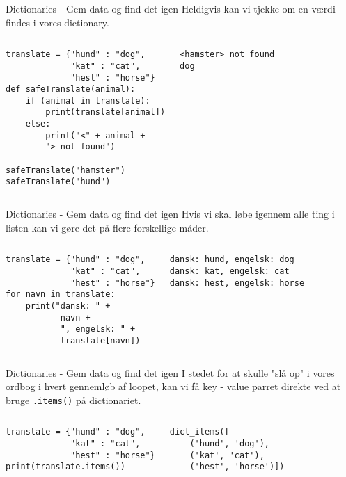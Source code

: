 \documentclass[main.tex]{subfiles}
\begin{document}
\begin{frame}[fragile]{Dictionaries - Gem data og find det igen}
	Heldigvis kan vi tjekke om en værdi findes i vores dictionary.
	\begin{columns}
		\begin{lstlisting}[style=python]
translate = {"hund" : "dog", 
             "kat" : "cat", 
             "hest" : "horse"}
def safeTranslate(animal):
	if (animal in translate):
		print(translate[animal])
	else:
		print("<" + animal + 
		"> not found")

safeTranslate("hamster")
safeTranslate("hund")
		\end{lstlisting}
		
		\pause
		\begin{lstlisting}[style=python]
<hamster> not found
dog
		\end{lstlisting}
	\end{columns}	
\end{frame}

\begin{frame}[fragile]{Dictionaries - Gem data og find det igen}
	Hvis vi skal løbe igennem alle ting i listen kan vi gøre det på flere forskellige måder.
	\begin{columns}
		\column{0.5\textwidth}
		\begin{lstlisting}[style=python]
translate = {"hund" : "dog", 
             "kat" : "cat", 
             "hest" : "horse"}
for navn in translate:
	print("dansk: " + 
	       navn + 
	       ", engelsk: " + 
	       translate[navn])
		\end{lstlisting}
		
		\pause
		\column{0.45\textwidth}
		\begin{lstlisting}[style=python]
dansk: hund, engelsk: dog
dansk: kat, engelsk: cat
dansk: hest, engelsk: horse
		\end{lstlisting}
	\end{columns}	
\end{frame}

\begin{frame}[fragile]{Dictionaries - Gem data og find det igen}
I stedet for at skulle "slå op" i vores ordbog i hvert gennemløb af loopet, kan vi få key - value parret direkte ved at bruge \texttt{.items()} på dictionariet.
\begin{columns}
	\column{0.55\textwidth}
	\begin{lstlisting}[style=python]
translate = {"hund" : "dog", 
             "kat" : "cat", 
             "hest" : "horse"}
print(translate.items())
	\end{lstlisting}
	
	\pause
	\column{0.44\textwidth}
	\begin{lstlisting}[style=python]
dict_items([
    ('hund', 'dog'), 
    ('kat', 'cat'), 
    ('hest', 'horse')])
	\end{lstlisting}
\end{columns}	
\end{frame}
\end{document}
